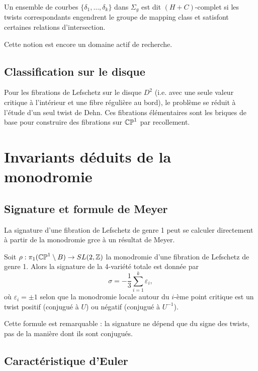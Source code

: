 \begin{definition}
Un ensemble de courbes $\{\delta_1,\dots,\delta_k\}$ dans $\Sigma_g$ est dit $(H+C)$-complet si les twists correspondants engendrent le groupe de mapping class et satisfont certaines relations d'intersection.
\end{definition}

Cette notion est encore un domaine actif de recherche.

\subsection{Classification sur le disque}

Pour les fibrations de Lefschetz sur le disque $D^2$ (i.e. avec une seule valeur critique à l'intérieur et une fibre régulière au bord), le problème se réduit à l'étude d'un seul twist de Dehn. Ces fibrations élémentaires sont les briques de base pour construire des fibrations sur $\mathbb{CP}^1$ par recollement.

\section{Invariants déduits de la monodromie}

\subsection{Signature et formule de Meyer}

La signature d'une fibration de Lefschetz de genre 1 peut se calculer directement à partir de la monodromie grce à un résultat de Meyer.

\begin{theoreme}[Meyer]
Soit $\rho: \pi_1(\mathbb{CP}^1 \setminus B) \to SL(2,\mathbb{Z})$ la monodromie d'une fibration de Lefschetz de genre 1. Alors la signature de la 4-variété totale est donnée par
\[
\sigma = -\frac{1}{3} \sum_{i=1}^k \varepsilon_i,
\]
où $\varepsilon_i = \pm 1$ selon que la monodromie locale autour du $i$-ème point critique est un twist positif (conjugué à $U$) ou négatif (conjugué à $U^{-1}$).
\end{theoreme}

Cette formule est remarquable : la signature ne dépend que du signe des twists, pas de la manière dont ils sont conjugués.

\subsection{Caractéristique d'Euler}

